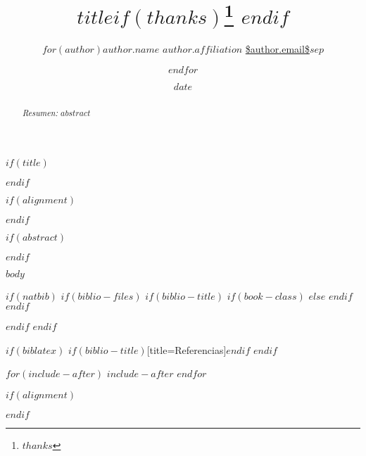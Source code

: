 \documentclass[letterpaper, 12pt, spanish]{article}
\title{\bigskip \bigskip $title$$if(thanks)$\thanks{$thanks$} $endif$ }
\author{$for(author)$\large $author.name$\vspace{0.05in} \newline\normalsize\emph{$author.affiliation$} \newline\footnotesize \url{$author.email$}\vspace*{0.2in}\newline $sep$ \and $endfor$}
\date{$date$}
\begin{document}
  $if(title)$
  \maketitle
  $endif$

  $if(alignment)$
  \begin{$alignment$}
  $endif$

  $if(abstract)$
  \begin{abstract}
  \noindent \emph{Resumen:} $abstract$
  \end{abstract}
  $endif$

  $body$

  $if(natbib)$
  $if(biblio-files)$
  $if(biblio-title)$
  $if(book-class)$
  \renewcommand\bibname{Bibliography}
  $else$
  \renewcommand\refname{References}
  $endif$
  $endif$
  
  $endif$
  $endif$

  $if(biblatex)$
  \printbibliography$if(biblio-title)$[title=Referencias]$endif$
  $endif$

  $for(include-after)$
  $include-after$
  $endfor$

  $if(alignment)$
  \end{$alignment$}
  $endif$
\end{document}
